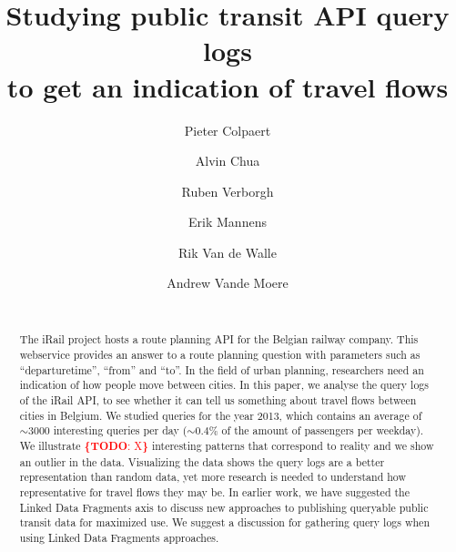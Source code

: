\documentclass{sig-alternate}
\newcommand{\todo}[1]{\noindent\textcolor{red}{{\bf \{TODO}: #1{\bf \}}}}
\begin{document}
\title{Studying public transit API query logs\\ to get an indication of travel flows}
\author{
\alignauthor
Pieter Colpaert\\
\and
\alignauthor
Alvin Chua\\
\and
\alignauthor
Ruben Verborgh\\
\and
\alignauthor
Erik Mannens\\
\and
\alignauthor
Rik Van de Walle\\
\and
\alignauthor
Andrew Vande Moere\\
\\
}

\maketitle
\begin{abstract}
The iRail project hosts a route planning API for the Belgian railway company.
This webservice provides an answer to a route planning question with parameters such as ``departuretime'', ``from'' and ``to''.
In the field of urban planning, researchers need an indication of how people move between cities. 
In this paper, we analyse the query logs of the iRail API, to see whether it can tell us something about travel flows between cities in Belgium.
We studied queries for the year 2013, which contains an average of $\sim3000$ interesting queries per day ($\sim0.4\%$ of the amount of passengers per weekday).
We illustrate \todo{X} interesting patterns that correspond to reality and we show an outlier in the data.
Visualizing the data shows the query logs are a better representation than random data, yet more research is needed to understand how representative for travel flows they may be.
In earlier work, we have suggested the Linked Data Fragments axis to discuss new approaches to publishing queryable public transit data for maximized use.
We suggest a discussion for gathering query logs when using Linked Data Fragments approaches.

\end{abstract}
\end{document}
